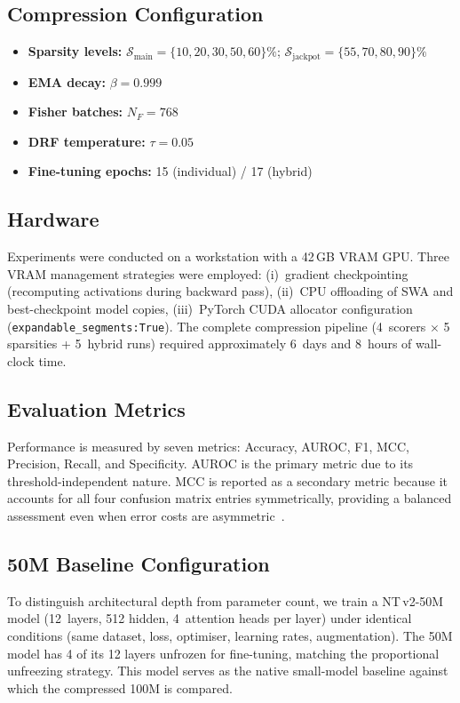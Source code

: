 \documentclass[journal]{IEEEtran}
\newcommand{\ntvsmall}{NT\,v2-50M}
\begin{document}
\subsection{Compression Configuration}

\begin{itemize}[nosep]
  \item \textbf{Sparsity levels:}
        $\mathcal{S}_{\text{main}} = \{10, 20, 30, 50, 60\}\%$;
        $\mathcal{S}_{\text{jackpot}} = \{55, 70, 80, 90\}\%$
  \item \textbf{EMA decay:} $\beta = 0.999$
  \item \textbf{Fisher batches:} $N_F = 768$
  \item \textbf{DRF temperature:} $\tau = 0.05$
  \item \textbf{Fine-tuning epochs:} 15 (individual) / 17 (hybrid)
\end{itemize}

\subsection{Hardware}

Experiments were conducted on a workstation with a 42\,GB VRAM
GPU.
Three VRAM management strategies were employed:
(i)~gradient checkpointing (recomputing activations during
backward pass),
(ii)~CPU offloading of SWA and best-checkpoint model copies,
(iii)~PyTorch CUDA allocator configuration
(\texttt{expandable\_segments:True}).
The complete compression pipeline (4~scorers $\times$ 5
sparsities + 5~hybrid runs) required approximately 6~days
and 8~hours of wall-clock time.

\subsection{Evaluation Metrics}

Performance is measured by seven metrics: Accuracy, AUROC,
F1, MCC, Precision, Recall, and Specificity.
AUROC is the primary metric due to its threshold-independent
nature.
MCC is reported as a secondary metric because it accounts
for all four confusion matrix entries symmetrically,
providing a balanced assessment even when error costs are
asymmetric~\cite{Chicco2020}.

\subsection{50M Baseline Configuration}

To distinguish architectural depth from parameter count,
we train a \ntvsmall{} model (12~layers, 512 hidden,
4~attention heads per layer) under identical conditions
(same dataset, loss, optimiser, learning rates, augmentation).
The 50M model has 4 of its 12 layers unfrozen for fine-tuning,
matching the proportional unfreezing strategy.
This model serves as the native small-model baseline against
which the compressed 100M is compared.
\end{document}
